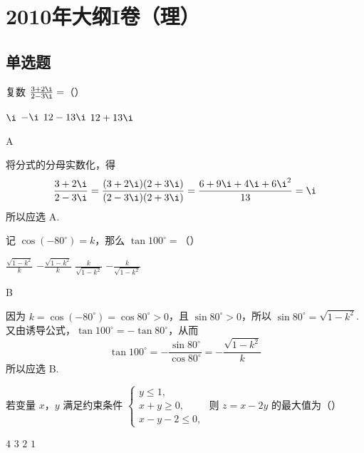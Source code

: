 \chapter{2010年大纲I卷（理）}

\section{单选题}

\begin{problem}
复数 \(\frac{3 + 2\i}{2 - 3\i} =\)（\quad）

\choices
    {\(\i\)}
    {\(-\i\)}
    {\(12 - 13\i\)}
    {\(12 + 13\i\)}
\end{problem}

\begin{answer}
A
\end{answer}

\begin{solution}
将分式的分母实数化，得
\[
\frac{3+2\i}{2-3\i}
=\frac{(3+2\i)(2+3\i)}{(2-3\i)(2+3\i)}
=\frac{6+9\i+4\i+6\i^{2}}{13}
=\i
\]
所以应选 A.
\end{solution}

\begin{problem}
记 \(\cos (-80^{\circ}) = k\)，那么 \(\tan 100^{\circ} =\)（\quad）

\choices
    {\(\frac{\sqrt{1 - k^2}}{k}\)}
    {\(-\frac{\sqrt{1 - k^2}}{k}\)}
    {\(\frac{k}{\sqrt{1 - k^2}}\)}
    {\(-\frac{k}{\sqrt{1 - k^2}}\)}
\end{problem}

\begin{answer}
B
\end{answer}

\begin{solution}
因为 \(k=\cos(-80^{\circ})=\cos80^{\circ}>0\)，且 \(\sin80^{\circ}>0\)，所以
\(\sin80^{\circ}=\sqrt{1-k^{2}}\). 又由诱导公式，\(\tan100^{\circ}=-\tan80^{\circ}\)，从而
\[
\tan100^{\circ}
=-\frac{\sin80^{\circ}}{\cos80^{\circ}}
=-\frac{\sqrt{1-k^{2}}}{k}
\]
所以应选 B.
\end{solution}

\begin{problem}
若变量 \(x\)，\(y\) 满足约束条件 \(\begin{cases}
y \leqslant 1,\\
x + y \geqslant 0,\\
x - y - 2 \leqslant 0,
\end{cases}\) 则 \(z = x - 2y\) 的最大值为（\quad）

\choices
    {\(4\)}
    {\(3\)}
    {\(2\)}
    {\(1\)}
\end{problem}

